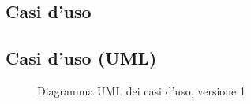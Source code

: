 \subsection{Casi d'uso}





\pagebreak

\subsection{Casi d'uso (UML)}
\vspace{0.5cm}
\begin{figure}[h]
    \centering
    \caption{Diagramma UML dei casi d'uso, versione 1}
    \label{fig:use_case_uml_v1}
\end{figure}